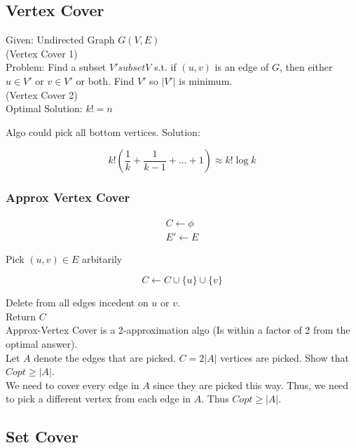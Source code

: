 \documentclass{article}
\begin{document}
\subsection{Vertex Cover}

Given: Undirected Graph $G(V, E)$\\

(Vertex Cover 1)\\

Problem: Find a subset $V' subset V$ s.t. if $(u, v)$ is an edge of $G$, then either
$u \in V'$ or $v \in V'$ or both. Find $V'$ so $|V'|$ is minimum.\\

(Vertex Cover 2)\\

Optimal Solution: $k! = n$

Algo could pick all bottom vertices. Solution: 

$$
    k!\left(\frac{1}{k} + \frac{1}{k - 1} + \dots + 1\right)
    \approx k!\log{k}
$$

\subsubsection{Approx Vertex Cover}

\begin{align*}
C \leftarrow \phi \\
E' \leftarrow E
\end{align*}

Pick $(u, v) \in E$ arbitarily

$$
    C \leftarrow C \cup \{u\} \cup \{v\}
$$

Delete from all edges incedent on $u$ or $v$.\\
Return $C$ \\

Approx-Vertex Cover is a 2-approximation algo (Is within a factor of 2 from
the optimal answer).\\

Let $A$ denote the edges that are picked. $C = 2|A|$ vertices are picked. Show that
$Copt \ge |A|$. \\

We need to cover every edge in $A$ since they
are picked this way. Thus, we need to pick a different vertex from each edge in
$A$. Thus $Copt \ge |A|$.

\subsection{Set Cover}
\end{document}
